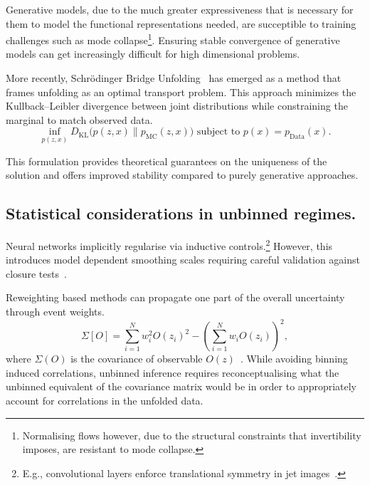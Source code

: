             Generative models, due to the much greater expressiveness that is necessary for them to model the functional representations needed, are succeptible to training challenges such as mode collapse\footnote{Normalising flows however, due to the structural constraints that invertibility imposes, are resistant to mode collapse.}.
            Ensuring stable convergence of generative models can get increasingly difficult for high dimensional problems.
            
            More recently, Schrödinger Bridge Unfolding~\cite{Butter2025GenerativeMapping} has emerged as a method that frames unfolding as an optimal transport problem.
            This approach minimizes the Kullback--Leibler divergence between joint distributions while constraining the marginal to match observed data.
            \begin{equation}
                \inf_{p(z,x)} D_{\text{KL}}\Big(p(z,x) \parallel p_{\text{MC}}(z,x)\Big) \text{ subject to } p(x) = p_{\text{Data}}(x).
            \end{equation}

            This formulation provides theoretical guarantees on the uniqueness of the solution and offers improved stability compared to purely generative approaches.
        \subsection{Statistical considerations in unbinned regimes.}  
            Neural networks implicitly regularise via inductive controls.\footnote{E.g., convolutional layers enforce translational symmetry in jet images~\cite{Kheddar2025ImageSurvey}.}
            However, this introduces model dependent smoothing scales requiring careful validation against closure tests~\cite{Cowan2011AsymptoticPhysics}.

            Reweighting based methods can propagate one part of the overall uncertainty through event weights.
            \begin{equation}
                \Sigma[O] = \sum_{i=1}^N w_i^2 O(z_i)^2 - \left(\sum_{i=1}^N w_i O(z_i)\right)^2,
            \end{equation}
            where \(\Sigma(O)\) is the covariance of observable \(O(z)\)~\cite{LHCHiggsCrossSectionWorkingGroup2012HandbookDistributions}.
            While avoiding binning induced correlations, unbinned inference requires reconceptualising what the unbinned equivalent of the covariance matrix would be in order to appropriately account for correlations in the unfolded data.

